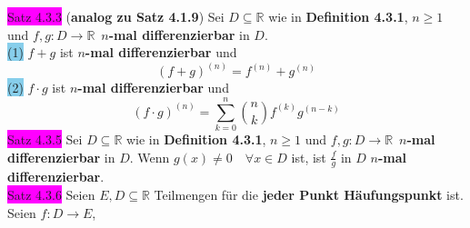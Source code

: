 \documentclass[landscape, 10pt]{article}
\newcommand{\R}{\mathbb{R}}
\begin{document}
\begin{multicols}{3}
              \colorbox{magenta}{Satz 4.3.3} 
              (\textbf{analog zu Satz 4.1.9}) 
                     Sei \textcolor{NavyBlue}{$D\subseteq\R$} 
                     wie in 
                     \textbf{Definition 4.3.1}, 
                     \textcolor{NavyBlue}{$n\geqslant1$} und 
                     \textcolor{NavyBlue}{
                     $f,g:D\longrightarrow\R$}\,
                     \textbf{$n$-mal 
                     differenzierbar} in 
                     \textcolor{NavyBlue}{$D$}.\\
                     \colorbox{SkyBlue}{(1)} 
                            \textcolor{NavyBlue}{$f+g$} 
                            ist $n$\textbf{-mal 
                            differenzierbar} und 
                            \begin{equation*}
                                   (f+g)^{(n)}=f^{(n)}+g^{(n)}
                            \end{equation*}
                     \colorbox{SkyBlue}{(2)} 
                            \textcolor{NavyBlue}{$f\cdot g$}
                            ist $n$\textbf{-mal differenzierbar} 
                            und 
                            \begin{equation*}
                                   (f\cdot g)^{(n)}
                                   =\sum_{k=0}^n
                                   \binom{n}{k}f^{(k)}g^{(n-k)}
                            \end{equation*}
              \colorbox{magenta}{Satz 4.3.5} 
                     Sei \textcolor{NavyBlue}{
                     $D\subseteq\R$} wie in 
                     \textbf{Definition 4.3.1}, 
                     \textcolor{NavyBlue}{$n\geqslant1$} und 
                     \textcolor{NavyBlue}{
                     $f,g:D\longrightarrow\R$}\,
                     \textbf{$n$-mal differenzierbar} in 
                     \textcolor{NavyBlue}{$D$}. Wenn 
                     \textcolor{NavyBlue}{
                     $g(x)\neq0\quad\forall x\in D$} ist, 
                     ist \textcolor{NavyBlue}{$\frac{f}{g}$} 
                     in \textcolor{NavyBlue}{$D$} 
                     $n$\textbf{-mal differenzierbar}. \\
              \colorbox{magenta}{Satz 4.3.6} 
                     Seien \textcolor{NavyBlue}{
                     $E,D\subseteq\R$} Teilmengen 
                     für die \textbf{jeder Punkt 
                     Häufungspunkt} ist. Seien 
                     \textcolor{NavyBlue}{$f:D\longrightarrow E$},\\

\end{multicols}
\end{document}
